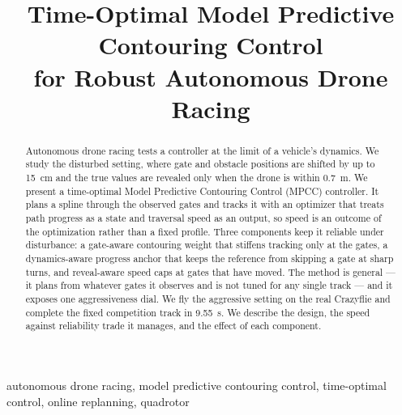 \documentclass[conference]{IEEEtran}
\begin{document}
\title{Time-Optimal Model Predictive Contouring Control\\ for Robust Autonomous Drone Racing}

\author{
\and
{}
}

\maketitle

\begin{abstract}
Autonomous drone racing tests a controller at the limit of a vehicle's dynamics. We study the disturbed setting, where gate and obstacle positions are shifted by up to 15~cm and the true values are revealed only when the drone is within 0.7~m. We present a time-optimal Model Predictive Contouring Control (MPCC) controller. It plans a spline through the observed gates and tracks it with an optimizer that treats path progress as a state and traversal speed as an output, so speed is an outcome of the optimization rather than a fixed profile. Three components keep it reliable under disturbance: a gate-aware contouring weight that stiffens tracking only at the gates, a dynamics-aware progress anchor that keeps the reference from skipping a gate at sharp turns, and reveal-aware speed caps at gates that have moved. The method is general — it plans from whatever gates it observes and is not tuned for any single track — and it exposes one aggressiveness dial. We fly the aggressive setting on the real Crazyflie and complete the fixed competition track in 9.55~s. We describe the design, the speed against reliability trade it manages, and the effect of each component.
\end{abstract}

\begin{IEEEkeywords}
autonomous drone racing, model predictive contouring control, time-optimal control, online replanning, quadrotor
\end{IEEEkeywords}
\end{document}
